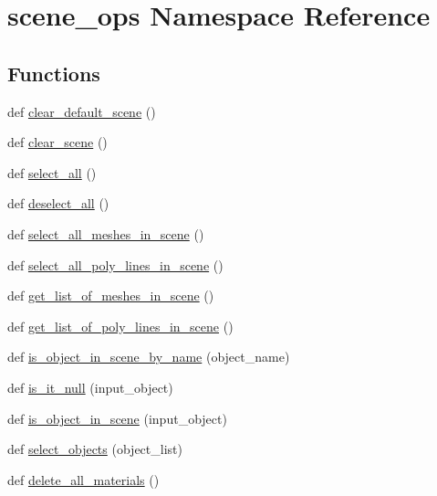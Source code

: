\hypertarget{namespacescene__ops}{}\section{scene\+\_\+ops Namespace Reference}
\label{namespacescene__ops}
\subsection*{Functions}
\begin{DoxyCompactItemize}
\item 
def \hyperlink{namespacescene__ops_a0a095fa009a3cde388c2dde77fffe387}{clear\+\_\+default\+\_\+scene} ()
\item 
def \hyperlink{namespacescene__ops_a946d205afbcb5dac76ef1c8861fe1adf}{clear\+\_\+scene} ()
\item 
def \hyperlink{namespacescene__ops_a6feb40fac5846109767eb59878352e3f}{select\+\_\+all} ()
\item 
def \hyperlink{namespacescene__ops_a5371f1444b398f8e43606d7946564cdc}{deselect\+\_\+all} ()
\item 
def \hyperlink{namespacescene__ops_aff24b186c82a6189df597ef8eb43c956}{select\+\_\+all\+\_\+meshes\+\_\+in\+\_\+scene} ()
\item 
def \hyperlink{namespacescene__ops_aa424c948ca2eec5670bdf906e4527c16}{select\+\_\+all\+\_\+poly\+\_\+lines\+\_\+in\+\_\+scene} ()
\item 
def \hyperlink{namespacescene__ops_adc0091c56883aedad33808acdb82aff4}{get\+\_\+list\+\_\+of\+\_\+meshes\+\_\+in\+\_\+scene} ()
\item 
def \hyperlink{namespacescene__ops_a74b7be47a66023c9f424557737b68e9a}{get\+\_\+list\+\_\+of\+\_\+poly\+\_\+lines\+\_\+in\+\_\+scene} ()
\item 
def \hyperlink{namespacescene__ops_ae4cefdfa0b71034698a6549f23e0327e}{is\+\_\+object\+\_\+in\+\_\+scene\+\_\+by\+\_\+name} (object\+\_\+name)
\item 
def \hyperlink{namespacescene__ops_ac93248faad68fc09afc3aaa3df51a4ca}{is\+\_\+it\+\_\+null} (input\+\_\+object)
\item 
def \hyperlink{namespacescene__ops_ab795d6dd195f1f9d5ec2d17c15a76ffe}{is\+\_\+object\+\_\+in\+\_\+scene} (input\+\_\+object)
\item 
def \hyperlink{namespacescene__ops_a477cf5638e77e785a715bc92e9d3a796}{select\+\_\+objects} (object\+\_\+list)
\item 
def \hyperlink{namespacescene__ops_abe05573bf797e475d4d49a922452297b}{delete\+\_\+all\+\_\+materials} ()

\end{DoxyCompactItemize}
